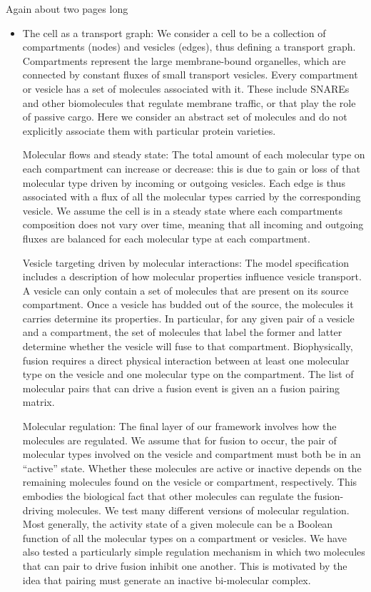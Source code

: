 Again about two pages long

\begin{itemize}
\item {}
The cell as a transport graph: We consider a cell to be a collection of
compartments (nodes) and vesicles (edges), thus defining a transport graph.
Compartments represent the large membrane-bound organelles, which are
connected by constant fluxes of small transport vesicles. Every compartment
or vesicle has a set of molecules associated with it. These include SNAREs
and other biomolecules that regulate membrane traffic, or that play the
role of passive cargo. Here we consider an abstract set of molecules and do
not explicitly associate them with particular protein varieties.

Molecular flows and steady state: The total amount of each molecular type
on each compartment can increase or decrease: this is due to gain or loss
of that molecular type driven by incoming or outgoing vesicles. Each edge
is thus associated with a flux of all the molecular types carried by the
corresponding vesicle. We assume the cell is in a steady state where each
compartments composition does not vary over time, meaning that all
incoming and outgoing fluxes are balanced for each molecular type at each
compartment.

Vesicle targeting driven by molecular interactions: The model specification
includes a description of how molecular properties influence vesicle
transport. A vesicle can only contain a set of molecules that are present
on its source compartment. Once a vesicle has budded out of the source, the
molecules it carries determine its properties. In particular, for any given
pair of a vesicle and a compartment, the set of molecules that label the
former and latter determine whether the vesicle will fuse to that
compartment. Biophysically, fusion requires a direct physical interaction
between at least one molecular type on the vesicle and one molecular type
on the compartment. The list of molecular pairs that can drive a fusion
event is given an a fusion pairing matrix.

Molecular regulation: The final layer of our framework involves how the
molecules are regulated. We assume that for fusion to occur, the pair of
molecular types involved on the vesicle and compartment must both be in an
“active” state. Whether these molecules are active or inactive depends on
the remaining molecules found on the vesicle or compartment, respectively.
This embodies the biological fact that other molecules can regulate the
fusion-driving molecules. We test many different versions of molecular
regulation. Most generally, the activity state of a given molecule can be a
Boolean function of all the molecular types on a compartment or vesicles.
We have also tested a particularly simple regulation mechanism in which two
molecules that can pair to drive fusion inhibit one another. This is
motivated by the idea that pairing must generate an inactive bi-molecular
complex.


\end{itemize}
